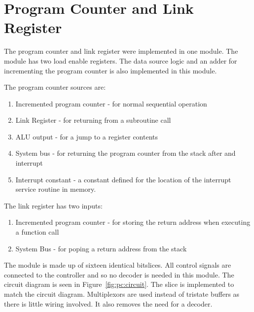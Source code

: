 
\section{Program Counter and Link Register}


The program counter and link register were implemented in one module.
The module has two load enable registers. 
The data source logic and an adder for incrementing the program counter is also implemented in this module.

The program counter sources are:
\begin{enumerate}
\item Incremented program counter - for normal sequential operation
\item Link Register - for returning from a subroutine call
\item ALU output - for a jump to a register contents
\item System bus - for returning the program counter from the stack after and interrupt
\item Interrupt constant - a constant defined for the location of the interrupt service routine in memory.
\end{enumerate}

The link register has two inputs:
\begin{enumerate}
\item Incremented program counter - for storing the return address when executing a function call
\item System Bus - for poping a return address from the stack 
\end{enumerate}

The module is made up of sixteen identical bitslices. 
All control signals are connected to the controller and so no decoder is needed in this module.
The circuit diagram is seen in Figure~\ref{fig:pc:circuit}.
The slice is implemented to match the circuit diagram. 
Multiplexors are used instead of tristate buffers as there is little wiring involved. 
It also removes the need for a decoder.

